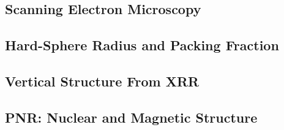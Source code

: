 \documentclass[\main/dresen_thesis.tex]{subfiles}
\renewcommand{\thisPath}{\main/chapters/looselyPackedNS/bilayerStacks}
\begin{document}
  \subsection{Scanning Electron Microscopy}
  
    \FloatBarrier

  \subsection{Hard-Sphere Radius and Packing Fraction}
  
    \FloatBarrier

  \subsection{Vertical Structure From XRR}
  
    \FloatBarrier

  \subsection{PNR: Nuclear and Magnetic Structure}
  
    \FloatBarrier
\end{document}
